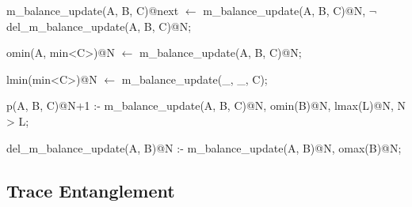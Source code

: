 \begin{Dedalus}

m\_balance\_update(A, B, C)@next \(\leftarrow\)
  m\_balance\_update(A, B, C)@N,
  \(\lnot\) del\_m\_balance\_update(A, B, C)@N;

omin(A, min<C>)@N \(\leftarrow\)
  m\_balance\_update(A, B, C)@N;

lmin(min<C>)@N \(\leftarrow\)
  m\_balance\_update(_, _, C);

p(A, B, C)@N+1 :-
  m\_balance\_update(A, B, C)@N,
  omin(B)@N,
  lmax(L)@N,
  N > L;

del\_m\_balance\_update(A, B)@N :-
  m\_balance\_update(A, B)@N,
  omax(B)@N;
  
\end{Dedalus}



\subsection{Trace Entanglement}

